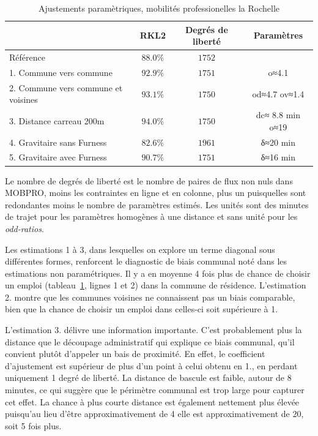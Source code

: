 \documentclass[
  10pt,
  a4paper,
  numbers=noendperiod,
  DIV=9]{scrreprt}
\begin{document}
\hypertarget{tbl-meapsR2-p}{}
\setlength{\LTpost}{0mm}
\begin{longtable}{lccc}
\caption{\label{tbl-meapsR2-p}Ajustements paramètriques, mobilités professionelles la Rochelle }\tabularnewline

\toprule
 & RKL2 & Degrés de liberté & Paramètres \\ 
\midrule
 Référence & $88.0\%$ & $1 752$ &  \\ 
1. Commune vers commune & $92.9\%$ & $1 751$ & o≈4.1 \\ 
2. Commune vers commune et voisines & $93.1\%$ & $1 750$ & od≈4.7 ov≈1.4 \\ 
3. Distance carreau 200m & $94.0\%$ & $1 750$ & dc≈ 8.8 min o≈19 \\ 
4. Gravitaire sans Furness & $82.6\%$ & $1 961$ & δ≈20 min \\ 
5. Gravitaire avec Furness & $90.7\%$ & $1 751$ & δ≈16 min \\ 
\bottomrule
\end{longtable}
\begin{minipage}{\linewidth}
Le nombre de degrés de liberté est le nombre de paires de flux non nuls dans MOBPRO, moins les contraintes en ligne et en colonne, plus un puisqu\textquotesingle{}elles sont redondantes moins le nombre de paramètres estimés. Les unités sont des minutes de trajet pour les paramètres homogènes à une distance et sans unité pour les \emph{odd-ratios}.\\
\end{minipage}

Les estimations 1 à 3, dans lesquelles on explore un terme diagonal sous
différentes formes, renforcent le diagnostic de biais communal noté dans
les estimations non paramétriques. Il y a en moyenne 4 fois plus de
chance de choisir un emploi (tableau~\ref{tbl-meapsR2-p}, lignes 1 et 2)
dans la commune de résidence. L'estimation 2. montre que les communes
voisines ne connaissent pas un biais comparable, bien que la chance de
choisir un emploi dans celles-ci soit supérieure à 1.

L'estimation 3. délivre une information importante. C'est probablement
plus la distance que le découpage administratif qui explique ce biais
communal, qu'il convient plutôt d'appeler un bais de proximité. En
effet, le coefficient d'ajustement est supérieur de plus d'un point à
celui obtenu en 1., en perdant uniquement 1 degré de liberté. La
distance de bascule est faible, autour de 8 minutes, ce qui suggère que
le périmètre communal est trop large pour capturer cet effet. La chance
à plus courte distance est également nettement plus élevée puisqu'au
lieu d'être approximativement de 4 elle est approximativement de 20,
soit 5 fois plus.
\end{document}
